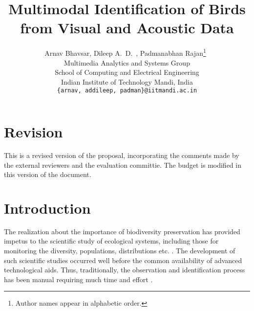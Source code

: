 \documentclass{article}
\begin{document}
\title{Multimodal Identification of Birds from Visual and Acoustic Data}
\author{Arnav Bhavsar, Dileep A.~D.~, Padmanabhan Rajan\footnote{Author names
appear in alphabetic order.}\  \\Multimedia Analytics and Systems Group \\ 
School of Computing and Electrical Engineering\\
Indian Institute of Technology Mandi, India\\
\texttt{\{arnav, addileep, padman\}@iitmandi.ac.in}}

\maketitle

\section*{Revision}

This is a revised version of the proposal, incorporating the comments made by
the external reviewers and the evaluation committie. The budget is modified in
this version of the document.

\section{Introduction}






The realization about the importance of biodiversity preservation has provided
impetus to the scientific study of ecological systems, including those for
monitoring the diversity, populations, distributions etc.
\cite{monitor1,monitor2,monitor3,monitor4}. 
The development of such scientific studies occurred well before the common
availability of advanced technological aids. Thus, traditionally, the
observation and identification process has been manual requiring much time and
effort \cite{monitor4,human1,human2}. 
\end{document}
